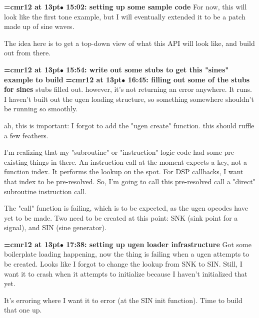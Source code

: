 {\smallskip\noindent\bf\font\titlefont=cmr12 at 13pt\titlefont $\bullet$ 15:02: setting up some sample code}\smallskip
For now, this will look like the first tone example, but I will eventually extended it to be a patch made up of sine waves.
\par

The idea here is to get a top-down view of what this API will look like, and build out from there.
\par

{\smallskip\noindent\bf\font\titlefont=cmr12 at 13pt\titlefont $\bullet$ 15:54: write out some stubs to get this "sines" example to build}\smallskip
{\smallskip\noindent\bf\font\titlefont=cmr12 at 13pt\titlefont $\bullet$ 16:45: filling out some of the stubs for sines}\smallskip
stubs filled out. however, it's not returning an error anywhere. It runs. I haven't built out the ugen loading structure, so something somewhere shouldn't be running so smoothly.
\par

ah, this is important: I forgot to add the "ugen create" function. this should ruffle a few feathers.
\par

I'm realizing that my "subroutine" or "instruction" logic code had some pre-existing things in there. An instruction call at the moment expects a key, not a function index. It performs the lookup on the spot. For DSP callbacks, I want that index to be pre-resolved. So, I'm going to call this pre-resolved call a "direct" subroutine instruction call.
\par

The "call" function is failing, which is to be expected, as the ugen opcodes have yet to be made. Two need to be created at this point: SNK (sink point for a signal), and SIN (sine generator).
\par

{\smallskip\noindent\bf\font\titlefont=cmr12 at 13pt\titlefont $\bullet$ 17:38: setting up ugen loader infrastructure}\smallskip
Got some boilerplate loading happening, now the thing is failing when a ugen attempts to be created. Looks like I forgot to change the lookup from SNK to SIN. Still, I want it to crash when it attempts to initialize because I haven't initialized that yet.
\par

It's erroring where I want it to error (at the SIN init function). Time to build that one up.
\par

